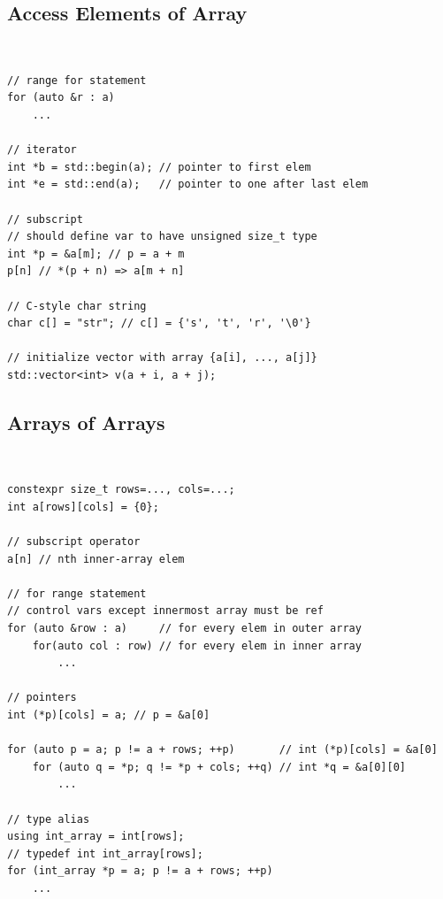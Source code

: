\documentclass{blog}
\begin{document}
\subsection{Access Elements of Array}
\begin{definition}~
    \begin{verbatim}
// range for statement
for (auto &r : a)
    ...

// iterator
int *b = std::begin(a); // pointer to first elem
int *e = std::end(a);   // pointer to one after last elem

// subscript
// should define var to have unsigned size_t type
int *p = &a[m]; // p = a + m
p[n] // *(p + n) => a[m + n]

// C-style char string
char c[] = "str"; // c[] = {'s', 't', 'r', '\0'}

// initialize vector with array {a[i], ..., a[j]}
std::vector<int> v(a + i, a + j);
\end{verbatim}
\end{definition}

\subsection{Arrays of Arrays}
\begin{definition}~
    \begin{verbatim}
constexpr size_t rows=..., cols=...;
int a[rows][cols] = {0};

// subscript operator
a[n] // nth inner-array elem

// for range statement
// control vars except innermost array must be ref
for (auto &row : a)     // for every elem in outer array
    for(auto col : row) // for every elem in inner array
        ...

// pointers
int (*p)[cols] = a; // p = &a[0]

for (auto p = a; p != a + rows; ++p)       // int (*p)[cols] = &a[0]
    for (auto q = *p; q != *p + cols; ++q) // int *q = &a[0][0]
        ...

// type alias
using int_array = int[rows];
// typedef int int_array[rows];
for (int_array *p = a; p != a + rows; ++p)
    ...
\end{verbatim}
\end{definition}
\end{document}
